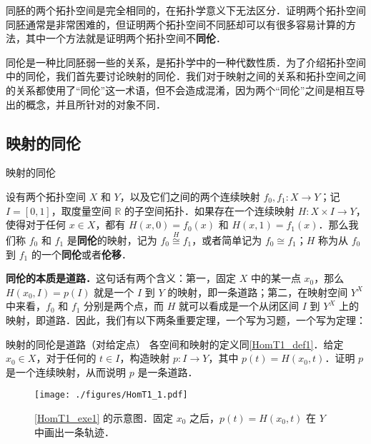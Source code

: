 
同胚的两个拓扑空间是完全相同的，在拓扑学意义下无法区分．证明两个拓扑空间同胚通常是非常困难的，但证明两个拓扑空间不同胚却可以有很多容易计算的方法，其中一个方法就是证明两个拓扑空间不\textbf{同伦}．

同伦是一种比同胚弱一些的关系，是拓扑学中的一种代数性质．为了介绍拓扑空间中的同伦，我们首先要讨论映射的同伦．我们对于映射之间的关系和拓扑空间之间的关系都使用了“同伦”这一术语，但不会造成混淆，因为两个“同伦”之间是相互导出的概念，并且所针对的对象不同．

\subsection{映射的同伦}

\begin{definition}{映射的同伦}\label{HomT1_def1}

设有两个拓扑空间 $X$ 和 $Y$，以及它们之间的两个连续映射 $f_0, f_1:X\rightarrow Y$；记 $I=[0, 1]$，取度量空间 $\mathbb{R}$ 的子空间拓扑．如果存在一个连续映射 $H: X\times I\rightarrow Y$，使得对于任何 $x\in X$，都有 $H(x, 0)=f_0(x)$ 和 $H(x, 1)=f_1(x)$．那么我们称 $f_0$ 和 $f_1$ 是\textbf{同伦}的映射，记为 $f_0\overset{H}{\cong} f_1$，或者简单记为 $f_0\cong f_1$；$H$ 称为从 $f_0$ 到 $f_1$ 的一个\textbf{同伦}或者\textbf{伦移}．

\end{definition}

\textbf{同伦的本质是道路．}这句话有两个含义：第一，固定 $X$ 中的某一点 $x_0$，那么 $H(x_0, I)=p(I)$ 就是一个 $I$ 到 $Y$ 的映射，即一条道路；第二，在映射空间 $Y^X$ 中来看，$f_0$ 和 $f_1$ 分别是两个点，而 $H$ 就可以看成是一个从闭区间 $I$ 到 $Y^X$ 上的映射，即道路．因此，我们有以下两条重要定理，一个写为习题，一个写为定理：

\begin{exercise}{映射的同伦是道路（对给定点）}\label{HomT1_exe1}
各空间和映射的定义同\autoref{HomT1_def1}．给定 $x_0\in X$，对于任何的 $t\in I$，构造映射 $p:I\rightarrow Y$，其中 $p(t)=H(x_0, t)$．证明 $p$ 是一个连续映射，从而说明 $p$ 是一条道路．
\end{exercise}

\begin{figure}[ht]
\centering
\texttt{[image: ./figures/HomT1\_1.pdf]}
\caption{\autoref{HomT1_exe1} 的示意图．固定 $x_0$ 之后，$p(t)=H(x_0, t)$ 在 $Y$ 中画出一条轨迹．} \label{HomT1_fig1}
\end{figure}



